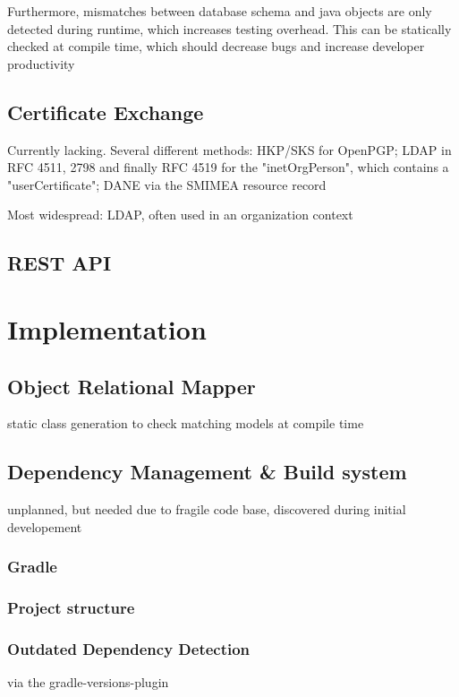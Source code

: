 Furthermore, mismatches between database schema and java objects are only detected during runtime, which increases
testing overhead. This can be statically checked at compile time, which should decrease bugs and increase developer
productivity

\section{Certificate Exchange}
Currently lacking. Several different methods:
HKP/SKS for OpenPGP;
LDAP in RFC 4511, 2798 and finally RFC 4519 for the "inetOrgPerson", which contains a "userCertificate";
DANE via the SMIMEA resource record

Most widespread: LDAP, often used in an organization context

\section{REST API}

\chapter{Implementation}

\section{Object Relational Mapper}
static class generation to check matching models at compile time

\section{Dependency Management \& Build system}
unplanned, but needed due to fragile code base, discovered during initial developement
\subsection{Gradle}
\subsection{Project structure}
\subsection{Outdated Dependency Detection} %
via the gradle-versions-plugin

